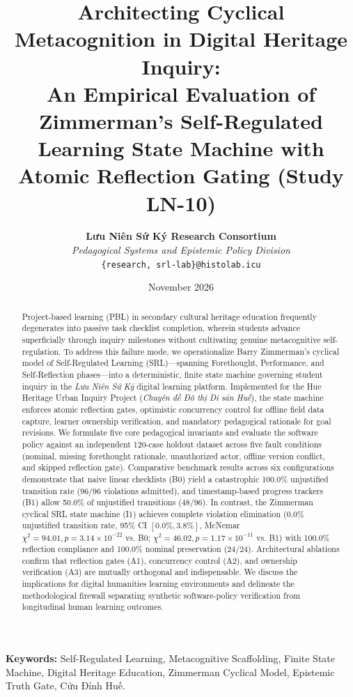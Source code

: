 \documentclass[11pt,a4paper]{article}
\title{\textbf{Architecting Cyclical Metacognition in Digital Heritage Inquiry:\\An Empirical Evaluation of Zimmerman's Self-Regulated Learning State Machine with Atomic Reflection Gating (Study LN-10)}}
\author{
    \textbf{Lưu Niên Sứ Ký Research Consortium}\\
    \textit{Pedagogical Systems and Epistemic Policy Division}\\
    \texttt{\{research, srl-lab\}@histolab.icu}
}
\date{November 2026}
\begin{document}
\maketitle

\begin{abstract}
Project-based learning (PBL) in secondary cultural heritage education frequently degenerates into passive task checklist completion, wherein students advance superficially through inquiry milestones without cultivating genuine metacognitive self-regulation. To address this failure mode, we operationalize Barry Zimmerman's cyclical model of Self-Regulated Learning (SRL)---spanning Forethought, Performance, and Self-Reflection phases---into a deterministic, finite state machine governing student inquiry in the \textit{Lưu Niên Sứ Ký} digital learning platform. Implemented for the Hue Heritage Urban Inquiry Project (\textit{Chuyên đề Đô thị Di sản Huế}), the state machine enforces atomic reflection gates, optimistic concurrency control for offline field data capture, learner ownership verification, and mandatory pedagogical rationale for goal revisions. We formulate five core pedagogical invariants and evaluate the software policy against an independent 120-case holdout dataset across five fault conditions (nominal, missing forethought rationale, unauthorized actor, offline version conflict, and skipped reflection gate). Comparative benchmark results across six configurations demonstrate that naive linear checklists (B0) yield a catastrophic 100.0\% unjustified transition rate ($96/96$ violations admitted), and timestamp-based progress trackers (B1) allow 50.0\% of unjustified transitions ($48/96$). In contrast, the Zimmerman cyclical SRL state machine (I1) achieves complete violation elimination (0.0\% unjustified transition rate, 95\% CI $[0.0\%, 3.8\%]$, McNemar $\chi^2 = 94.01, p = 3.14 \times 10^{-22}$ vs. B0; $\chi^2 = 46.02, p = 1.17 \times 10^{-11}$ vs. B1) with 100.0\% reflection compliance and 100.0\% nominal preservation ($24/24$). Architectural ablations confirm that reflection gates (A1), concurrency control (A2), and ownership verification (A3) are mutually orthogonal and indispensable. We discuss the implications for digital humanities learning environments and delineate the methodological firewall separating synthetic software-policy verification from longitudinal human learning outcomes.
\end{abstract}

\noindent\textbf{Keywords:} Self-Regulated Learning, Metacognitive Scaffolding, Finite State Machine, Digital Heritage Education, Zimmerman Cyclical Model, Epistemic Truth Gate, Cửu Đỉnh Huế.
\end{document}
